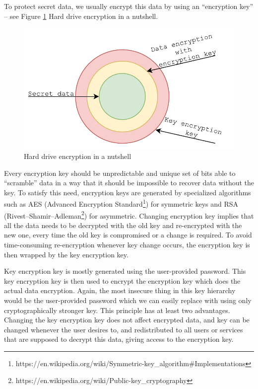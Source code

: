 To protect secret data, we usually encrypt this data by using an “encryption key” -- see Figure \ref{fig_encdata} Hard drive encryption in a nutshell.
\begin{figure}[h]
    \centering
    \includegraphics[scale=0.7]{figures/HowWeEncryptData.pdf}
    \caption{Hard drive encryption in a nutshell}
    \label{fig_encdata}
\end{figure}
Every encryption key should be unpredictable and unique set of bits able to “scramble” data in a way that it should be impossible to recover data without the key.
To satisfy this need, encryption keys are generated by specialized algorithms such as AES (Advanced Encryption Standard\footnote{https://en.wikipedia.org/wiki/Symmetric-key\_algorithm\#Implementations}) for symmetric keys and RSA (Rivest–Shamir–Adleman\footnote{https://en.wikipedia.org/wiki/Public-key\_cryptography}) for asymmetric.
Changing encryption key implies that all the data needs to be decrypted with the old key and re-encrypted with the new one, every time the old key is compromised or a change is required.
To avoid time-consuming re-encryption whenever key change occurs, the encryption key is then wrapped by the key encryption key.

Key encryption key is mostly generated using the user-provided password.
This key encryption key is then used to encrypt the encryption key which does the actual data encryption.
Again, the most insecure thing in this key hierarchy would be the user-provided password which we can easily replace with using only cryptographically stronger key.
This principle has at least two advantages.
Changing the key encryption key does not affect encrypted data, and key can be changed whenever the user desires to, and redistributed to all users or services that are supposed to decrypt this data, giving access to the encryption key.

